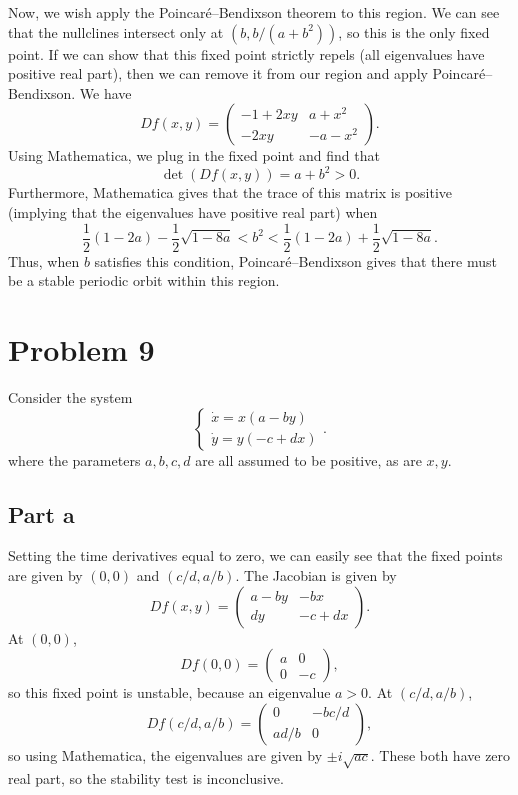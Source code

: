 \documentclass{article}
\begin{document}
Now, we wish apply the Poincar\'e--Bendixson theorem to this region. We can see that the nullclines intersect only at $(b,b/(a+b^2))$, so this is the only fixed point. If we can show that this fixed point strictly repels (all eigenvalues have positive real part), then we can remove it from our region and apply Poincar\'e--Bendixson. We have 
\[
Df(x,y)=\begin{pmatrix}
	-1+2xy&a+x^2\\
	-2xy&-a-x^2
\end{pmatrix}.
\]
Using Mathematica, we plug in the fixed point and find that 
\[
\det(Df(x,y))=a+b^2>0.
\]
Furthermore, Mathematica gives that the trace of this matrix is positive (implying that the eigenvalues have positive real part) when 
\[
\frac{1}{2} (1-2 a)-\frac{1}{2} \sqrt{1-8 a}<b^2<\frac{1}{2} (1-2 a)+\frac{1}{2} \sqrt{1-8 a}.
\]
Thus, when $b$ satisfies this condition, Poincar\'e--Bendixson gives that there must be a stable periodic orbit within this region.

\section{Problem 9}
Consider the system
\begin{equation*}
	\left\{\begin{array}{l}
		\dot{x}=x(a-by) \\
		\dot{y}=y(-c+dx)
	\end{array}\right..
\end{equation*}
where the parameters $a,b,c,d$ are all assumed to be positive, as are $x,y$.
\subsection{Part a}
Setting the time derivatives equal to zero, we can easily see that the fixed points are given by $(0,0)$ and $(c/d,a/b)$. The Jacobian is given by
\[
Df(x,y)=\begin{pmatrix}
	a-by&-bx\\
	dy&-c+dx
\end{pmatrix}.
\]
At $(0,0)$, 
\[
Df(0,0)=\begin{pmatrix}
	a&0\\
	0&-c
\end{pmatrix},
\]
so this fixed point is unstable, because an eigenvalue $a>0$. At $(c/d,a/b)$, 
\[
Df(c/d,a/b)=\begin{pmatrix}
	0&-bc/d\\
	ad/b&0
\end{pmatrix},
\]
so using Mathematica, the eigenvalues are given by $\pm i\sqrt{ac}$. These both have zero real part, so the stability test is inconclusive.
\end{document}
